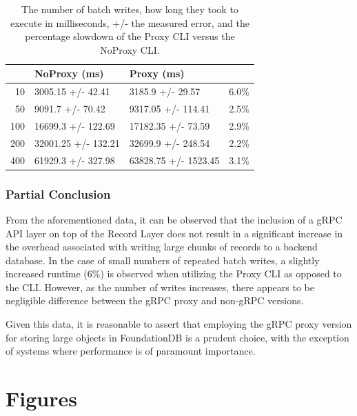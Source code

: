 \documentclass[sigconf]{acmart}
\begin{document}
\begin{table}[h]
\begin{tabular}{|r|l|l|r|}
    \hline
    \rowcolor[HTML]{656565} 
    \multicolumn{1}{|l|}{\cellcolor[HTML]{656565}{\color[HTML]{FFFFFF} \textbf{Writes}}} &
        {\color[HTML]{FFFFFF} \textbf{NoProxy (ms)}} &
        {\color[HTML]{FFFFFF} \textbf{Proxy (ms)}} &
        \multicolumn{1}{l|}{\cellcolor[HTML]{656565}{\color[HTML]{FFFFFF} \textbf{Slowdown}}} \\ \hline
    10  & 3005.15 +/- 42.41   & 3185.9 +/- 29.57     & 6.0\% \\
    \rowcolor[HTML]{EFEFEF} 
    50  & 9091.7 +/- 70.42    & 9317.05 +/- 114.41   & 2.5\% \\
    100 & 16699.3 +/- 122.69  & 17182.35 +/- 73.59   & 2.9\% \\
    \rowcolor[HTML]{EFEFEF} 
    200 & 32001.25 +/- 132.21 & 32699.9 +/- 248.54   & 2.2\% \\
    400 & 61929.3 +/- 327.98  & 63828.75 +/- 1523.45 & 3.1\% \\ \hline
\end{tabular}
\caption{The number of batch writes, how long they took to execute in milliseconds, +/- the measured error, and the percentage slowdown of the Proxy CLI versus the NoProxy CLI.}
\end{table}

\subsubsection{Partial Conclusion}

From the aforementioned data, it can be observed that the inclusion of a gRPC API layer on top of the Record Layer does not result in a significant increase in the overhead associated with writing large chunks of records to a backend database. In the case of small numbers of repeated batch writes, a slightly increased runtime (6\%) is observed when utilizing the Proxy CLI as opposed to the CLI. However, as the number of writes increases, there appears to be negligible difference between the gRPC proxy and non-gRPC versions.

Given this data, it is reasonable to assert that employing the gRPC proxy version for storing large objects in FoundationDB is a prudent choice, with the exception of systems where performance is of paramount importance.

\section{Figures}
\end{document}
